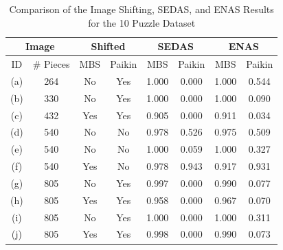 \begin{table}[tb]
\begin{center}
\begin{tabular}{ c|c||c|c||c|c||c|c } 
 \toprule
 \multicolumn{2}{c||}{Image} & \multicolumn{2}{c||}{Shifted} & \multicolumn{2}{c||}{SEDAS} & \multicolumn{2}{c}{ENAS} \\
\hline
 ID  & \# Pieces & MBS & Paikin & MBS & Paikin & MBS & Paikin  \\ 
\hline \hline
 (a) &  264     & No  & Yes & 1.000  & 0.000 & 1.000 & 0.544 \\ 
\hline
 (b) &  330     & No  & Yes & 1.000  & 0.000 & 1.000 &  0.090 \\ 
\hline
 (c) &  432     & Yes & Yes & 0.905 &  0.000 & 0.911 & 0.034 \\  
\hline
 (d) &  540     & No  & No  & 0.978 & 0.526 & 0.975 & 0.509 \\ 
\hline
 (e) &  540     & No  & No  & 1.000  &  0.059 & 1.000  & 0.327 \\ 
\hline
 (f) &  540     & Yes & No  & 0.978 & 0.943 & 0.917 & 0.931 \\ 
\hline
 (g) &  805     & No  & Yes & 0.997 &  0.000 & 0.990 &  0.077 \\ 
\hline
 (h) &  805     & Yes & Yes & 0.958 &  0.000   & 0.967 &  0.070 \\ 
\hline
 (i) &  805     & No  & Yes & 1.000  &  0.000   & 1.000  &  0.311 \\ 
\hline
 (j) &  805     & Yes & Yes & 0.998 &  0.000   & 0.990 &   0.073 \\ 
 \bottomrule
\end{tabular}
\end{center}
\caption{Comparison of the Image Shifting, SEDAS, and ENAS Results for the 10 Puzzle Dataset}\label{tab:pomeranzBestBuddiesVisualizations}
\end{table}